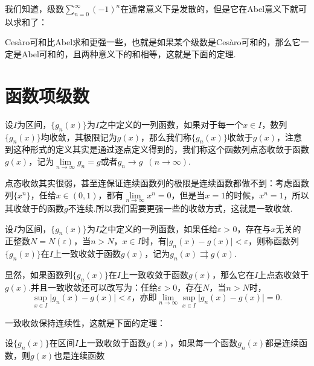     我们知道，级数\(\sum\limits_{n=0}^{\infty}(-1)^n\)在通常意义下是发散的，但是它在Abel意义下就可以求和了：
    \begin{definition}

    \end{definition}
    Ces\`{a}ro可和比Abel求和更强一些，也就是如果某个级数是Ces\`{a}ro可和的，那么它一定是Abel可和的，且两种意义下的和相等，这就是下面的定理.
    \begin{theorem}
        
    \end{theorem}
\section{函数项级数}

设\(I\)为区间，\(\{g_n(x)\}\)为\(I\)之中定义的一列函数，如果对于每一个\(x\in I\)，数列\(\{g_n(x)\}\)均收敛，其极限记为\(g(x)\)，那么我们称\(\{g_n(x)\}\)收敛于\(g(x)\)，注意到这种形式的定义其实是通过{\heiti 逐点定义}得到的，我们称这个函数列{\heiti 点态收敛}于函数\(g(x)\)，记为\(\lim\limits_{n\to \infty}g_n=g\)或者\(g_n\to g\enspace(n\to\infty)\).

点态收敛其实很弱，甚至连保证连续函数列的极限是连续函数都做不到：考虑函数列\(\{x^n\}\)，任给\(x\in(0,1)\)，都有\(\lim\limits_{n\to \infty}x^n = 0\)，但是当\(x=1\)的时候，\(x^n=1\)，所以其收敛于的函数\(g\)不连续.所以我们需要更强一些的收敛方式，这就是{\heiti 一致收敛}.

\begin{definition}[一致收敛]
    设\(I\)为区间，\(\{g_n(x)\}\)为\(I\)之中定义的一列函数，如果任给\(\varepsilon>0\)，存在与\(x\)无关的正整数\(N = N(\varepsilon)\)，当\(n>N\)，\(x\in I\)时，有\(\vert g_n(x)-g(x)\vert<\varepsilon\)，则称函数列\(\{g_n(x)\}\)在\(I\)上{\heiti 一致收敛}于函数\(g(x)\)，记为\(g_n(x)\rightrightarrows g(x)\).
\end{definition}

显然，如果函数列\(\{g_n(x)\}\)在\(I\)上一致收敛于函数\(g(x)\)，那么它在\(I\)上点态收敛于\(g(x)\).并且一致收敛还可以改写为：任给\(\varepsilon >0\)，存在\(N\)，当\(n>N\)时，\[\sup_{x\in I}\vert g_n(x)-g(x)\vert<\varepsilon\text{，亦即}\lim_{n\to\infty}\sup_{x\in I}\vert g_{n}(x)-g(x)\vert = 0.\]

一致收敛保持连续性，这就是下面的定理：
\begin{theorem}
    设\(\{g_n(x)\}\)在区间\(I\)上一致收敛于函数\(g(x)\)，如果每一个函数\(g_{n}(x)\)都是连续函数，则\(g(x)\)也是连续函数
\end{theorem}

